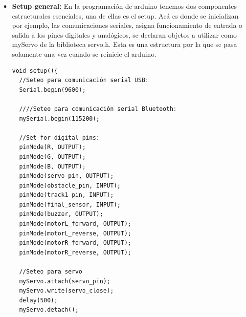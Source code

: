 \begin{itemize}

    \item \textbf{ Setup general:} En la programación de arduino tenemos dos componentes estructurales esenciales, una de ellas es el setup. Acá es donde se inicializan por ejemplo, las comunicaciones seriales, asigna funcionamiento de entrada o salida a los pines digitales y analógicos, se declaran objetos a utilizar como myServo de la biblioteca servo.h. Esta es una estructura por la que se pasa solamente una vez cuando se reinicie el arduino. 
    \begin{lstlisting}
void setup(){
  //Seteo para comunicación serial USB:
  Serial.begin(9600);

  ////Seteo para comunicación serial Bluetooth:
  mySerial.begin(115200);

  //Set for digital pins:
  pinMode(R, OUTPUT);
  pinMode(G, OUTPUT);
  pinMode(B, OUTPUT);
  pinMode(servo_pin, OUTPUT);
  pinMode(obstacle_pin, INPUT);
  pinMode(track1_pin, INPUT);
  pinMode(final_sensor, INPUT);
  pinMode(buzzer, OUTPUT);
  pinMode(motorL_forward, OUTPUT);
  pinMode(motorL_reverse, OUTPUT);
  pinMode(motorR_forward, OUTPUT);
  pinMode(motorR_reverse, OUTPUT);

  //Seteo para servo
  myServo.attach(servo_pin);
  myServo.write(servo_close);
  delay(500);
  myServo.detach();
  

\end{lstlisting}
\end{itemize}
